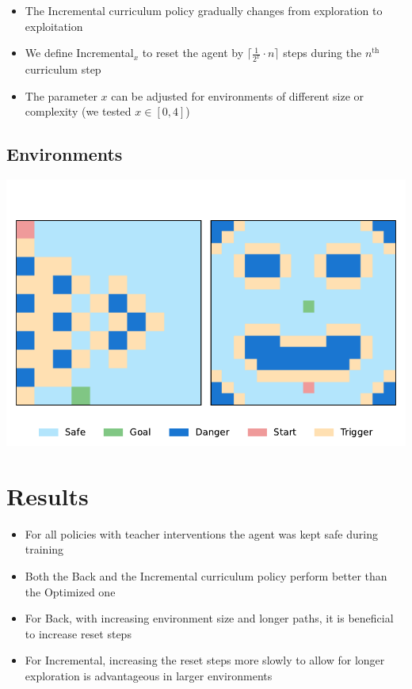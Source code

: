 \documentclass[a0,portrait]{a0poster}
\begin{document}
\begin{multicols}{3}
\begin{itemize}
    \item The Incremental curriculum policy gradually changes from exploration to exploitation
    \item We define Incremental$_x$ to reset the agent by $\lceil \frac{1}{2^x} \cdot n \rceil$ steps during the $n^{\text{th}}$ curriculum step
    \item The parameter $x$ can be adjusted for environments of different size or complexity (we tested $x\in[0,4]$)
\end{itemize}

\subsection{Environments}

\begin{minipage}{\columnwidth}\begin{center}
    \includegraphics[width=\linewidth]{assets/maps.pdf}
\end{center}\end{minipage}
\vspace{1em}

\section{Results}

\begin{itemize}
    \item For all policies with teacher interventions the agent was kept safe during training
    \item Both the Back and the Incremental curriculum policy perform better than the Optimized one
    \item For Back, with increasing environment size and longer paths, it is beneficial to increase reset steps
    \item For Incremental, increasing the reset steps more slowly to allow for longer exploration is advantageous in larger environments
\end{itemize}


\end{multicols}
\end{document}
